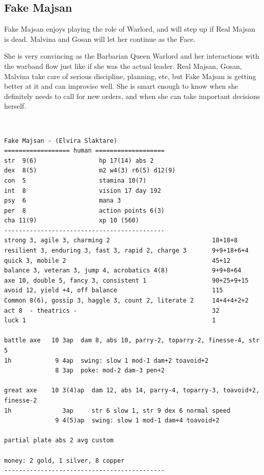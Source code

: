 \clearpage
\begin{samepage}
\subsection*{Fake Majsan}
Fake Majsan enjoys playing the role of Warlord, and will step up if Real Majsan is dead. Malvina and Gosan will let her continue as the Face.

She is very convincing as the Barbarian Queen Warlord and her interactions with the warband flow just like if she was the actual leader. Real Majsan, Gosan, Malvina take care of serious discipline, planning, etc, but Fake Majsan is getting better at it and can improvise well. She is smart enough to know when she definitely needs to call for new orders, and when she can take important decisions herself.

\

\small \begin{verbatim}
Fake Majsan - (Elvira Slaktare)
================== human ===================
str  9(6)                 hp 17(14) abs 2
dex  8(5)                 m2 w4(3) r6(5) d12(9)
con  5                    stamina 10(7)
int  8                    vision 17 day 192
psy  6                    mana 3
per  8                    action points 6(3)
cha 11(9)                 xp 10 (560)
--------------------------------------------
strong 3, agile 3, charming 2                            18+18+8
resilient 3, enduring 3, fast 3, rapid 2, charge 3       9+9+18+6+4
quick 3, mobile 2                                        45+12
balance 3, veteran 3, jump 4, acrobatics 4(8)            9+9+8+64
axe 10, double 5, fancy 3, consistent 1                  90+25+9+15
avoid 12, yield +4, off balance                          115
Common 8(6), gossip 3, haggle 3, count 2, literate 2     14+4+4+2+2
act 8  - theatrics -                                     32
luck 1                                                   1

battle axe   10 3ap  dam 8, abs 10, parry-2, toparry-2, finesse-4, str 5
1h            9 4ap  swing: slow 1 mod-1 dam+2 toavoid+2
              8 3ap  poke: mod-2 dam-3 pen+2

great axe    10 3(4)ap  dam 12, abs 14, parry-4, toparry-3, toavoid+2, finesse-2
1h              3ap     str 6 slow 1, str 9 dex 6 normal speed
              9 4(5)ap  swing: slow 1 mod-1 dam+4 toavoid+2

partial plate abs 2 avg custom

money: 2 gold, 1 silver, 8 copper
--------------------------------------------
\end{verbatim} \normalsize
\end{samepage}






